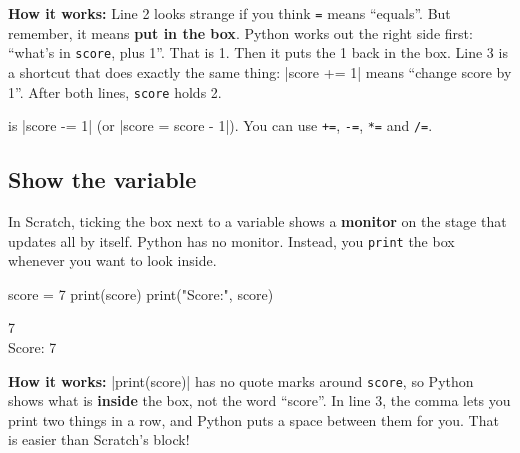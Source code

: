 \textbf{How it works:} Line 2 looks strange if you think \texttt{=} means ``equals''. But remember, it means \textbf{put in the box}. Python works out the right side first: ``what's in \texttt{score}, plus 1''. That is 1. Then it puts the 1 back in the box. Line 3 is a shortcut that does exactly the same thing: \py|score += 1| means ``change score by 1''. After both lines, \texttt{score} holds 2.

\begin{think}
 is \py|score -= 1| (or \py|score = score - 1|). You can use \texttt{+=}, \texttt{-=}, \texttt{*=} and \texttt{/=}.
\end{think}

\subsection*{Show the variable}

In Scratch, ticking the box next to a variable shows a \textbf{monitor} on the stage that updates all by itself. Python has no monitor. Instead, you \texttt{print} the box whenever you want to look inside.

\begin{tcbraster}[raster columns=2, raster equal height=rows, raster column skip=12pt, raster valign=center]
\begin{tcolorbox}[colback=white, colframe=white, boxrule=0pt, valign=center]
\begin{scratch}
\end{scratch}
\end{tcolorbox}
\begin{code}
score = 7
print(score)
print("Score:", score)
\end{code}
\end{tcbraster}

\begin{outputbox}
7\\
Score: 7
\end{outputbox}

\textbf{How it works:} \py|print(score)| has no quote marks around \texttt{score}, so Python shows what is \textbf{inside} the box, not the word ``score''. In line 3, the comma lets you print two things in a row, and Python puts a space between them for you. That is easier than Scratch's  block!

